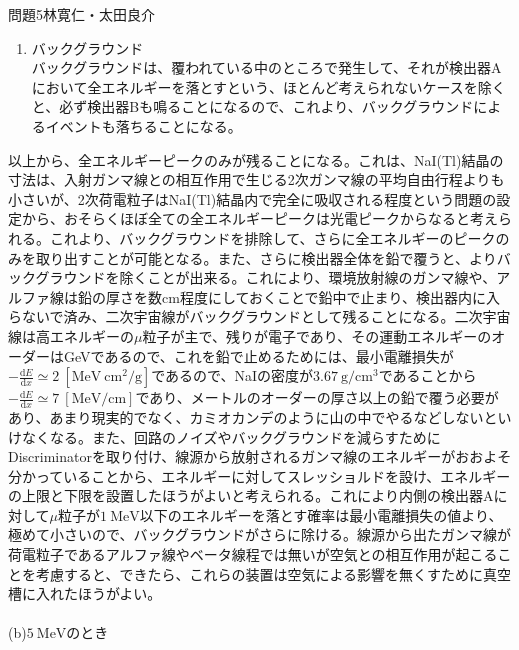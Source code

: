 \documentclass[fleqn]{jbook}
\begin{document}
\begin{answer}{問題5}{林寛仁・太田良介}
\begin{enumerate}
\begin{enumerate}
\item
バックグラウンド\\
バックグラウンドは、覆われている中のところで発生して、それが検出器Aにおいて全エネルギーを落とすという、ほとんど考えられないケースを除くと、必ず検出器Bも鳴ることになるので、これより、バックグラウンドによるイベントも落ちることになる。
\end{enumerate}
以上から、全エネルギーピークのみが残ることになる。これは、NaI(Tl)結晶の寸法は、入射ガンマ線との相互作用で生じる2次ガンマ線の平均自由行程よりも小さいが、2次荷電粒子はNaI(Tl)結晶内で完全に吸収される程度という問題の設定から、おそらくほぼ全ての全エネルギーピークは光電ピークからなると考えられる。これより、バックグラウンドを排除して、さらに全エネルギーのピークのみを取り出すことが可能となる。また、さらに検出器全体を鉛で覆うと、よりバックグラウンドを除くことが出来る。これにより、環境放射線のガンマ線や、アルファ線は鉛の厚さを数cm程度にしておくことで鉛中で止まり、検出器内に入らないで済み、二次宇宙線がバックグラウンドとして残ることになる。二次宇宙線は高エネルギーの$\mu$粒子が主で、残りが電子であり、その運動エネルギーのオーダーはGeVであるので、これを鉛で止めるためには、最小電離損失が$-\frac{ \mathrm{d} E}{\mathrm{d} x} \simeq 2\ [\mathrm{MeV\ cm^2/g}]$であるので、NaIの密度が$3.67 \ \mathrm{g/cm^3}$であることから$-\frac{ \mathrm{d} E}{\mathrm{d} x} \simeq 7\ [\mathrm{MeV/cm}]$であり、メートルのオーダーの厚さ以上の鉛で覆う必要があり、あまり現実的でなく、カミオカンデのように山の中でやるなどしないといけなくなる。また、回路のノイズやバックグラウンドを減らすためにDiscriminatorを取り付け、線源から放射されるガンマ線のエネルギーがおおよそ分かっていることから、エネルギーに対してスレッショルドを設け、エネルギーの上限と下限を設置したほうがよいと考えられる。これにより内側の検出器Aに対して$\mu$粒子が$1 \ \mathrm{MeV}$以下のエネルギーを落とす確率は最小電離損失の値より、極めて小さいので、バックグラウンドがさらに除ける。線源から出たガンマ線が荷電粒子であるアルファ線やベータ線程では無いが空気との相互作用が起こることを考慮すると、できたら、これらの装置は空気による影響を無くすために真空槽に入れたほうがよい。\\
\\
(b)$5 \ \mathrm{MeV}$のとき\\


\end{enumerate}
\end{answer}
\end{document}
